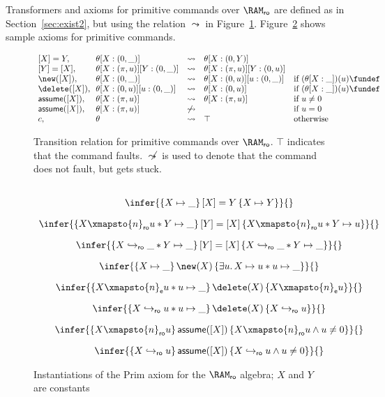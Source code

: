 Transformers and axioms for primitive commands over $\RAM_{\sf ro}$ are defined
as in Section~\ref{sec:exist2}, but using the relation $\leadsto$ in
Figure~\ref{fig:transfer2}. Figure~\ref{fig:prim2} shows sample axioms for
primitive commands.
\begin{figure}[h]
\centerline{
$
\begin{array}{l@{\ \ }l@{\quad}l@{\quad}l@{\quad}l}
[X] = Y, &\theta[X : (0, \_)] &\leadsto& \theta[X: (0,Y)]
\\{}
[Y] = [X], &\theta[X : (\pi, u)][Y : (0, \_)] &\leadsto&
\theta[X:(\pi, u)][Y:(0, u)]
\\
\new([X]), &\theta[X : (0, \_)] &\leadsto&
\theta[X: (0, u)][u : (0, \_)]& \text{if}~{(\theta[X : \_])(u)\fundef}
\\
\delete([X]),&\theta[X : (0, u)][u : (0, \_)] &\leadsto&
\theta[X:(0,u)]& \text{if}~{(\theta[X:\_])(u)\fundef}
\\
{\sf assume}([X]), &\theta[X : (\pi, u)] &\leadsto& \theta[X : (\pi, u)]
&\text{if}~u\not=0
\\
{\sf assume}([X]), &\theta[X : (\pi, u)] &\not\leadsto&
&\text{if}~u =0
\\
c, &\theta &\leadsto& \top
&\text{otherwise}
\end{array}
$}
\caption{\label{fig:transfer2}
Transition relation for primitive commands over $\RAM_{\sf ro}$.
$\top$ indicates that the command faults.
$\not\leadsto$ is used to denote that the command does not fault, but gets stuck.
}
\end{figure}
\begin{figure}[h]
$$
\begin{array}{c}
\\
\infer%
{\{X \mapsto \_\}\, [X] = Y\, \{X \mapsto Y\}}{}
\\[10pt]
\infer%
{\{X \xmapsto{n}_{\sf ro} u*
Y \mapsto \_ \}\, [Y] = [X]\, 
\{X \xmapsto{n}_{\sf ro} u *
Y \mapsto u \}}{}
\\[10pt]
\infer%
{\{X \hookrightarrow_{\sf ro} \_*
Y \mapsto \_ \}\, 
[Y] = [X]\, 
\{X \hookrightarrow_{\sf ro} \_*
Y \mapsto \_ \}}{}
\\[10pt]
\infer%
{\{X \mapsto \_ \}\, \new(X)\, \{\exists u.\, X \mapsto u*
u \mapsto \_\}}{}
\\[10pt]
\infer%
{\{X \xmapsto{n}_{\sf e} u * u \mapsto \_\}\, \delete(X)\, \{
X \xmapsto{n}_{\sf e} u\}}{}
\\[10pt]
\infer%
{\{X \hookrightarrow_{\sf ro} u * u \mapsto \_\}\, \delete(X)\, \{
X \hookrightarrow_{\sf ro} u\}}{}
\\[10pt] 
\infer
{\{X \xmapsto{n}_{\sf ro} u\}\, {\sf assume}([X])\, \{X \xmapsto{n}_{\sf ro} u
  \wedge u \not= 0\}}{}
\\[10pt] 
\infer
{\{X \hookrightarrow_{\sf ro} u\}\, {\sf assume}([X])\, \{X \hookrightarrow_{\sf ro} u
  \wedge u \not= 0\}}{}
\end{array}
$$
\caption{Instantiations of the {\sc Prim} axiom for the $\RAM_{\sf ro}$
  algebra; $X$ and $Y$ are constants}
\label{fig:prim2}
\end{figure}


